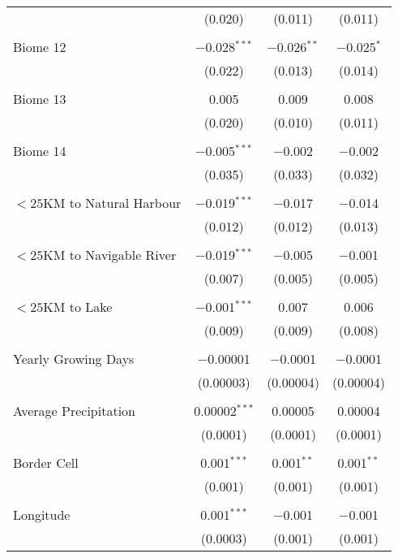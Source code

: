 \documentclass[11pt, oneside]{article}   	%
\begin{document}
\begin{spacing}{1.3}
\begin{table}[h]
{\begin{tabular}{@{\extracolsep{0pt}}lccc}
        & (0.020) & (0.011) & (0.011) \\
        & & & \\[-1.8ex]
       Biome 12 & $-$0.028$^{***}$ & $-$0.026$^{**}$ & $-$0.025$^{*}$ \\
        & (0.022) & (0.013) & (0.014) \\
        & & & \\[-1.8ex]
       Biome 13 & 0.005 & 0.009 & 0.008 \\
        & (0.020) & (0.010) & (0.011) \\
        & & & \\[-1.8ex]
       Biome 14 & $-$0.005$^{***}$ & $-$0.002 & $-$0.002 \\
        & (0.035) & (0.033) & (0.032) \\
        & & & \\[-1.8ex]
       $<25$KM to Natural Harbour & $-$0.019$^{***}$ & $-$0.017 & $-$0.014 \\
        & (0.012) & (0.012) & (0.013) \\
        & & & \\[-1.8ex]
       $<25$KM to Navigable River & $-$0.019$^{***}$ & $-$0.005 & $-$0.001 \\
        & (0.007) & (0.005) & (0.005) \\
        & & & \\[-1.8ex]
       $<25$KM to Lake & $-$0.001$^{***}$ & 0.007 & 0.006 \\
        & (0.009) & (0.009) & (0.008) \\
        & & & \\[-1.8ex]
       Yearly Growing Days & $-$0.00001 & $-$0.0001 & $-$0.0001 \\
        & (0.00003) & (0.00004) & (0.00004) \\
        & & & \\[-1.8ex]
       Average Precipitation & 0.00002$^{***}$ & 0.00005 & 0.00004 \\
        & (0.0001) & (0.0001) & (0.0001) \\
        & & & \\[-1.8ex]
       Border Cell & 0.001$^{***}$ & 0.001$^{**}$ & 0.001$^{**}$ \\
        & (0.001) & (0.001) & (0.001) \\
        & & & \\[-1.8ex]
       Longitude & 0.001$^{***}$ & $-$0.001 & $-$0.001 \\
        & (0.0003) & (0.001) & (0.001) \\

\end{tabular}}
\end{table}
\end{spacing}
\end{document}
